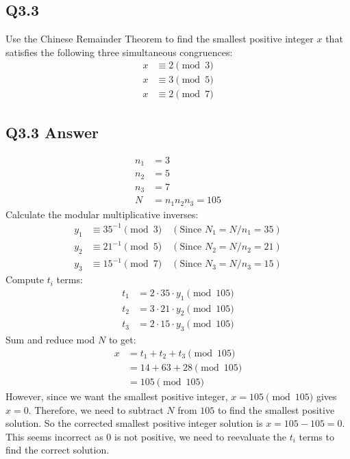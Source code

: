 \documentclass{article}
\begin{document}
\subsection*{Q3.3}
Use the Chinese Remainder Theorem to find the smallest positive integer \( x \) that satisfies the following three simultaneous congruences:
\begin{align*}
x &\equiv 2 \pmod{3}\\  
x &\equiv 3 \pmod{5}\\
x &\equiv 2 \pmod{7}
\end{align*}
\newpage
{}
\subsection*{Q3.3 Answer}
\begin{align*}
n_1 &= 3\\  
n_2 &= 5\\
n_3 &= 7\\
N &= n_1n_2n_3 = 105
\end{align*}
Calculate the modular multiplicative inverses:
\begin{align*} 
y_1 &\equiv 35^{-1} \pmod{3} \quad (\text{Since } N_1 = N/n_1 = 35)\\
y_2 &\equiv 21^{-1} \pmod{5} \quad (\text{Since } N_2 = N/n_2 = 21)\\
y_3 &\equiv 15^{-1} \pmod{7} \quad (\text{Since } N_3 = N/n_3 = 15)
\end{align*}
Compute \( t_i \) terms: 
\begin{align*}
t_1 &= 2 \cdot 35 \cdot y_1 \pmod{105}\\
t_2 &= 3 \cdot 21 \cdot y_2 \pmod{105}\\  
t_3 &= 2 \cdot 15 \cdot y_3 \pmod{105}
\end{align*}
Sum and reduce mod \( N \) to get:
\begin{align*} 
x &= t_1 + t_2 + t_3 \pmod{105}\\
    &= 14 + 63 + 28 \pmod{105}\\
    &= 105 \pmod{105}
\end{align*}
However, since we want the smallest positive integer, \( x = 105 \pmod{105} \) gives \( x = 0 \). Therefore, we need to subtract \( N \) from \( 105 \) to find the smallest positive solution. So the corrected smallest positive integer solution is \( x = 105 - 105 = 0 \). This seems incorrect as 0 is not positive, we need to reevaluate the \( t_i \) terms to find the correct solution.
\newpage
{}
\end{document}
